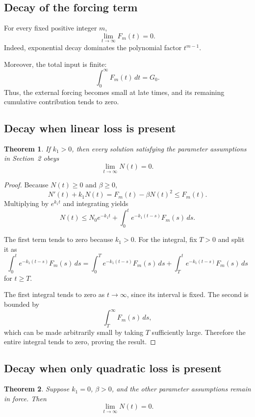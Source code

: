 \documentclass[12pt]{article}
\newtheorem{theorem}{Theorem}[section]
\theoremstyle{definition}
\theoremstyle{remark}
\begin{document}
\subsection{Decay of the forcing term}

For every fixed positive integer \(m\),
\[
\lim_{t\to\infty}F_m(t)=0.
\]
Indeed, exponential decay dominates the polynomial
factor \(t^{m-1}\).

Moreover, the total input is finite:
\[
\int_0^\infty F_m(t)\,dt=G_0.
\]
Thus, the external forcing becomes small at late times,
and its remaining cumulative contribution tends to zero.

\subsection{Decay when linear loss is present}

\begin{theorem}
If \(k_1>0\), then every solution satisfying the
parameter assumptions in Section~2 obeys
\[
\lim_{t\to\infty}N(t)=0.
\]
\end{theorem}

\begin{proof}
Because \(N(t)\geq 0\) and \(\beta\geq 0\),
\[
N'(t)+k_1N(t)
=F_m(t)-\beta N(t)^2
\leq F_m(t).
\]
Multiplying by \(e^{k_1t}\) and integrating yields
\[
N(t)\leq
N_0e^{-k_1t}
+\int_0^t e^{-k_1(t-s)}F_m(s)\,ds.
\]

The first term tends to zero because \(k_1>0\).
For the integral, fix \(T>0\) and split it as
\[
\int_0^t e^{-k_1(t-s)}F_m(s)\,ds
=
\int_0^T e^{-k_1(t-s)}F_m(s)\,ds
+
\int_T^t e^{-k_1(t-s)}F_m(s)\,ds
\]
for \(t\geq T\).

The first integral tends to zero as \(t\to\infty\),
since its interval is fixed. The second is bounded by
\[
\int_T^\infty F_m(s)\,ds,
\]
which can be made arbitrarily small by taking \(T\)
sufficiently large. Therefore the entire integral
tends to zero, proving the result.
\end{proof}

\subsection{Decay when only quadratic loss is present}

\begin{theorem}
Suppose \(k_1=0\), \(\beta>0\), and the other parameter
assumptions remain in force. Then
\[
\lim_{t\to\infty}N(t)=0.
\]
\end{theorem}
\end{document}
